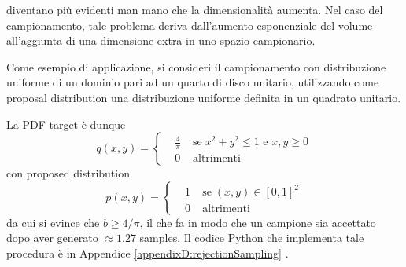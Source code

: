 diventano pi\`u evidenti man mano che la dimensionalit\`a aumenta. Nel caso del campionamento, tale problema deriva dall'aumento esponenziale del 
volume all'aggiunta di una dimensione extra in uno spazio campionario.\par
Come esempio di applicazione, si consideri il campionamento con distribuzione uniforme di un dominio pari ad un quarto di disco unitario, 
utilizzando come proposal distribution una distribuzione uniforme definita in un quadrato unitario\footnotemark{}.\par
La PDF target \`e dunque 
\begin{equation}
	q(x,y) = \left\{\begin{aligned}
		&\frac{4}{\pi}\;&\mathrm{se}\;x^2+y^2\leq1\text{ e }x,y\geq0\\
		&0 &\mathrm{altrimenti}
	\end{aligned}\right.
\end{equation}
con proposed distribution 
\begin{equation}
	p(x,y) = \left\{\begin{aligned}
		&1\;&\mathrm{se}\;(x,y)\in[0,1]^2\\
		&0 &\mathrm{altrimenti}
	\end{aligned}\right.
\end{equation}
da cui si evince che $b\geq4/\pi$, il che fa in modo che un campione sia accettato dopo aver generato $\approx1.27$ samples. Il codice Python che 
implementa tale procedura \`e in Appendice \ref{appendixD:rejectionSampling}
\label{appendixD:rejectionSampling}.
